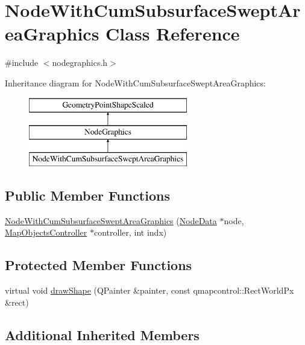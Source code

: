 \hypertarget{class_node_with_cum_subsurface_swept_area_graphics}{}\section{Node\+With\+Cum\+Subsurface\+Swept\+Area\+Graphics Class Reference}
\label{class_node_with_cum_subsurface_swept_area_graphics}


{\ttfamily \#include $<$nodegraphics.\+h$>$}

Inheritance diagram for Node\+With\+Cum\+Subsurface\+Swept\+Area\+Graphics\+:\begin{figure}[H]
\begin{center}
\leavevmode
\includegraphics[height=3.000000cm]{d4/df3/class_node_with_cum_subsurface_swept_area_graphics}
\end{center}
\end{figure}
\subsection*{Public Member Functions}
\begin{DoxyCompactItemize}
\item 
\mbox{\hyperlink{class_node_with_cum_subsurface_swept_area_graphics_ad44a7524edad763bcf80c1d88edaffa5}{Node\+With\+Cum\+Subsurface\+Swept\+Area\+Graphics}} (\mbox{\hyperlink{class_node_data}{Node\+Data}} $\ast$node, \mbox{\hyperlink{class_map_objects_controller}{Map\+Objects\+Controller}} $\ast$controller, int indx)
\end{DoxyCompactItemize}
\subsection*{Protected Member Functions}
\begin{DoxyCompactItemize}
\item 
virtual void \mbox{\hyperlink{class_node_with_cum_subsurface_swept_area_graphics_a1eac330d4a28b03ccecbcbd5c5568599}{draw\+Shape}} (Q\+Painter \&painter, const qmapcontrol\+::\+Rect\+World\+Px \&rect)
\end{DoxyCompactItemize}
\subsection*{Additional Inherited Members}


